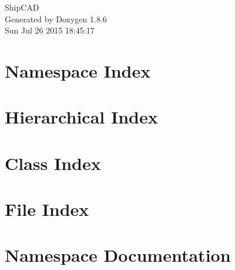 \documentclass[twoside]{book}
\newcommand{\clearemptydoublepage}{%
  \newpage{\pagestyle{empty}\cleardoublepage}%
}
\begin{document}
\hypersetup{pageanchor=false}
\begin{titlepage}
\vspace*{7cm}
\begin{center}%
{\Large Ship\-C\-A\-D }\\
\vspace*{1cm}
{\large Generated by Doxygen 1.8.6}\\
\vspace*{0.5cm}
{\small Sun Jul 26 2015 18:45:17}\\
\end{center}
\end{titlepage}
\clearemptydoublepage
\tableofcontents
\clearemptydoublepage
{}
\hypersetup{pageanchor=true}

\chapter{Namespace Index}

\chapter{Hierarchical Index}

\chapter{Class Index}

\chapter{File Index}

\chapter{Namespace Documentation}




\end{document}
